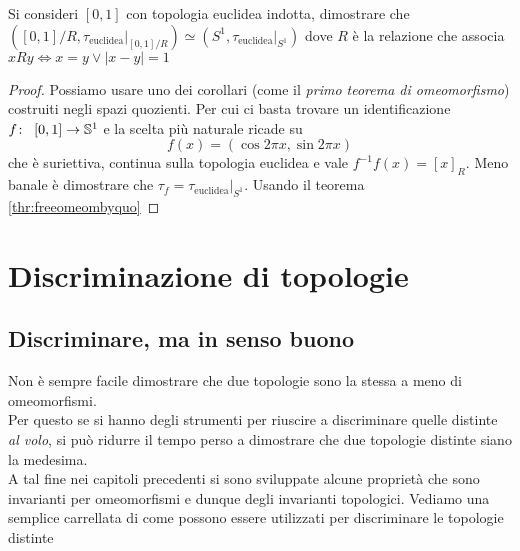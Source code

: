 \begin{theorem}
	Si consideri $\left[0,1\right]$ con topologia euclidea indotta, dimostrare che $(\left[0,1\right]/R, \tau_{\text{euclidea}}|_{\left[0,1\right]/R}) \simeq (S^1, \tau_{\text{euclidea}}|_{S^1})$ dove $R$ è la relazione che associa $xRy \Leftrightarrow x = y \lor |x - y| = 1$
\end{theorem}
\begin{proof}
	Possiamo usare uno dei corollari (come il \textit{primo teorema di omeomorfismo}) costruiti negli spazi quozienti. Per cui ci basta trovare un identificazione $f \colon\ \left[0,1\right] \rightarrow \mathbb{S}^1$ e la scelta più naturale ricade su 
	\begin{equation*}
		f(x) = (\cos 2\pi x, \sin 2 \pi x)
	\end{equation*}
	che è suriettiva, continua sulla topologia euclidea e vale $f^{-1}f(x) = \left[x\right]_R$. Meno banale è dimostrare che $\tau_f = \tau_{\text{euclidea}}|_{S^1}$. Usando il teorema \ref{thr:freeomeombyquo}
\end{proof}



\section{Discriminazione di topologie}
\subsection{\textcolor{TopGener}{\textbf{Discriminare, ma in senso buono}}}



Non è sempre facile dimostrare che due topologie sono la stessa a meno di omeomorfismi. \\ Per questo se si hanno degli strumenti per riuscire a discriminare quelle distinte \textit{al volo}, si può ridurre il tempo perso a dimostrare che due topologie distinte siano la medesima. \\ A tal fine nei capitoli precedenti si sono sviluppate alcune proprietà che sono invarianti per omeomorfismi e dunque degli invarianti topologici. Vediamo una semplice carrellata di come possono essere utilizzati per discriminare le topologie distinte

